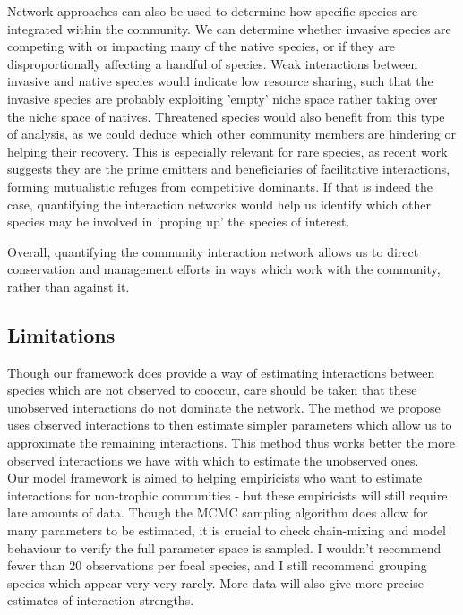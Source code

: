 \documentclass[a4,12pt]{article}
\begin{document}
        Network approaches can also be used to determine how specific species are integrated within the community. We can determine whether invasive species are competing with or impacting many of the native species, or if they are disproportionally affecting a handful of species. Weak interactions between invasive and native species would indicate low resource sharing, such that the invasive species are probably exploiting 'empty' niche space rather taking over the niche space of natives. Threatened species would also benefit from this type of analysis, as we could deduce which other community members are hindering or helping their recovery. This is especially relevant for rare species, as recent work suggests they are the prime emitters and beneficiaries of facilitative interactions, forming mutualistic refuges from competitive dominants. If that is indeed the case, quantifying the interaction networks would help us identify which other species may be involved in 'proping up' the species of interest. 

        Overall, quantifying the community interaction network allows us to direct conservation and management efforts in ways which work with the community, rather than against it.


    \subsection{Limitations}
        
        Though our framework does provide a way of estimating interactions between species which are not observed to cooccur, care should be taken that these unobserved interactions do not dominate the network. The method we propose uses observed interactions to then estimate simpler parameters which allow us to approximate the remaining interactions. This method thus works better the more observed interactions we have with which to estimate the unobserved ones. \\

        Our model framework is aimed to helping empiricists who want to estimate interactions for non-trophic communities - but these empiricists will still require lare amounts of data. Though the MCMC sampling algorithm does allow for many parameters to be estimated, it is crucial to check chain-mixing and model behaviour to verify the full parameter space is sampled. I wouldn't recommend fewer than 20 observations per focal species, and I still recommend grouping species which appear very very rarely. More data will also give more precise estimates of interaction strengths. 
\end{document}
